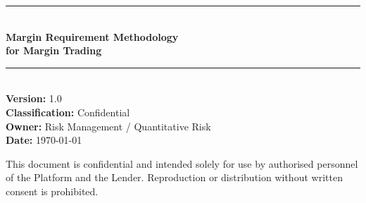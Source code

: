 \documentclass[12pt, a4paper]{article}
\begin{document}
\begin{titlepage}
    \centering
    \vspace*{2cm}
    {\color{darkblue}\rule{\linewidth}{1.5pt}}\\[0.4cm]
    {\Huge\bfseries\color{darkblue} Margin Requirement Methodology\\[0.3cm]
    for Margin Trading}\\[0.4cm]
    {\color{darkblue}\rule{\linewidth}{1.5pt}}\\[2cm]

    {\large\textbf{Version:} 1.0}\\[0.3cm]
    {\large\textbf{Classification:} Confidential}\\[0.3cm]
    {\large\textbf{Owner:} Risk Management / Quantitative Risk}\\[0.3cm]
    {\large\textbf{Date:} \today}\\[3cm]

    \begin{abstract}
    \noindent
    This document establishes the two-layer margin requirement framework
    underpinning the margin trading product. The framework is structured as
    a bottom-up hierarchy: a \emph{Layer~1} instrument-by-instrument floor
    grounded in the FINRA/Regulation~T paradigm, and a \emph{Layer~2}
    portfolio-level overlay that accounts for cross-asset correlations,
    diversification effects, concentration risk, and dynamic regime adjustment.
    The instrument floor provides an unconditional, rule-based minimum that
    is always enforced; the portfolio overlay may only tighten margin
    requirements relative to that floor, never relax them below it.
    This document serves as the methodological foundation for the
    Loan-to-Value~(LTV) Methodology (\emph{see} \texttt{trb\_method.tex}),
    which translates the margin requirement framework into operational LTV
    thresholds, haircut schedules, and liquidation triggers.
    \end{abstract}

    \vfill
    {\small\color{gray} This document is confidential and intended solely for use
    by authorised personnel of the Platform and the Lender. Reproduction or
    distribution without written consent is prohibited.}
\end{titlepage}

\tableofcontents
\newpage
\end{document}
